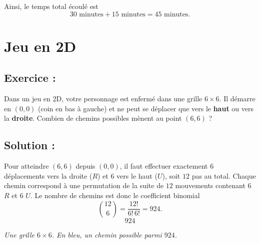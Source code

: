 \medskip
\noindent Ainsi, le temps total écoulé est
\[
30 \text{ minutes} + 15 \text{ minutes} = \boxed{45 \text{ minutes}.}
\]


\section{Jeu en 2D}

\subsection*{Exercice :}

\begin{exerciseBox}[Jeu en 2D]
Dans un jeu en 2D, votre personnage est enfermé dans une grille \(6\times 6\).
Il démarre en \((0,0)\) (coin en bas à gauche) et ne peut se déplacer que vers le \textbf{haut}
ou vers la \textbf{droite}.  
Combien de chemins possibles mènent au point \((6,6)\) ?    
\end{exerciseBox}


\subsection*{Solution :}

Pour atteindre \((6,6)\) depuis \((0,0)\), il faut effectuer exactement
\(6\) déplacements vers la droite (\(R\)) et \(6\) vers le haut (\(U\)),
soit \(12\) pas au total.  
Chaque chemin correspond à une permutation de la suite de \(12\) mouvements
contenant \(6\) \(R\) et \(6\) \(U\).  
Le nombre de chemins est donc le coefficient binomial
\[
\binom{12}{6}=\frac{12!}{6!\,6!}=924.
\]
\[
\boxed{924}
\]

\begin{center}

\smallskip
\emph{Une grille \(6\times6\). En bleu, un chemin possible parmi \(924\).}
\end{center}



